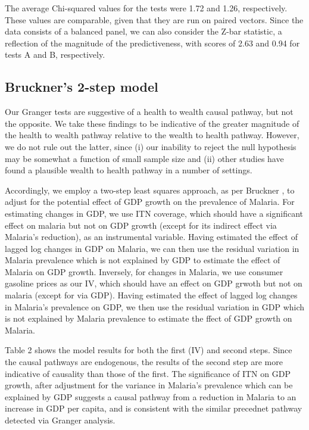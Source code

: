 \documentclass[9pt,twocolumn,twoside,lineno]{pnas-new}
\begin{document}
The average Chi-squared values for the tests were 1.72 and 1.26, respectively. These values are comparable, given that they are run on paired vectors. Since the data consists of a balanced panel, we can also consider the Z-bar statistic, a reflection of the magnitude of the predictiveness, with scores of 2.63 and 0.94 for tests A and B, respectively.






\subsection*{Bruckner's 2-step model}

Our Granger tests are suggestive of a health to wealth causal pathway, but not the opposite. We take these findings to be indicative of the greater magnitude of the health to wealth pathway relative to the wealth to health pathway. However, we do not rule out the latter, since (i) our inability to reject the null hypothesis may be somewhat a function of small sample size and (ii) other studies have found a plausible wealth to health pathway in a number of settings.

Accordingly, we employ a two-step least squares approach, as per Bruckner \cite{bruckner2011}, to adjust for the potential effect of GDP growth on the prevalence of Malaria. For estimating changes in GDP, we use ITN coverage, which should have a significant effect on malaria but not on GDP growth (except for its indirect effect via Malaria's reduction), as an instrumental variable. Having estimated the effect of lagged log changes in GDP on Malaria, we can then use the residual variation in Malaria prevalence which is not explained by GDP to estimate the effect of Malaria on GDP growth. Inversely, for changes in Malaria, we use consumer gasoline prices as our IV, which should have an effect on GDP grwoth but not on malaria (except for via GDP). Having estimated the effect of lagged log changes in Malaria's prevalence on GDP, we then use the residual variation in GDP which is not explained by Malaria prevalence to estimate the ffect of GDP growth on Malaria. 

Table 2 shows the model results for both the first (IV) and second steps. Since the causal pathways are endogenous, the results of the second step are more indicative of causality than those of the first. The significance of ITN on GDP growth, after adjustment for the variance in Malaria's prevalence which can be explained by GDP suggests a causal pathway from a reduction in Malaria to an increase in GDP per capita, and is consistent with the similar precednet pathway detected via Granger analysis.  
\end{document}
